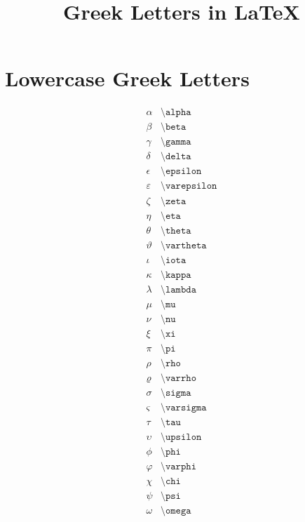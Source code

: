 \documentclass{article}
\title{Greek Letters in LaTeX}
\author{}
\date{}
\begin{document}
\maketitle

\section*{Lowercase Greek Letters}

\[
\begin{array}{ll}
\alpha & \texttt{\textbackslash alpha} \\
\beta & \texttt{\textbackslash beta} \\
\gamma & \texttt{\textbackslash gamma} \\
\delta & \texttt{\textbackslash delta} \\
\epsilon & \texttt{\textbackslash epsilon} \\
\varepsilon & \texttt{\textbackslash varepsilon} \\
\zeta & \texttt{\textbackslash zeta} \\
\eta & \texttt{\textbackslash eta} \\
\theta & \texttt{\textbackslash theta} \\
\vartheta & \texttt{\textbackslash vartheta} \\
\iota & \texttt{\textbackslash iota} \\
\kappa & \texttt{\textbackslash kappa} \\
\lambda & \texttt{\textbackslash lambda} \\
\mu & \texttt{\textbackslash mu} \\
\nu & \texttt{\textbackslash nu} \\
\xi & \texttt{\textbackslash xi} \\
\pi & \texttt{\textbackslash pi} \\
\rho & \texttt{\textbackslash rho} \\
\varrho & \texttt{\textbackslash varrho} \\
\sigma & \texttt{\textbackslash sigma} \\
\varsigma & \texttt{\textbackslash varsigma} \\
\tau & \texttt{\textbackslash tau} \\
\upsilon & \texttt{\textbackslash upsilon} \\
\phi & \texttt{\textbackslash phi} \\
\varphi & \texttt{\textbackslash varphi} \\
\chi & \texttt{\textbackslash chi} \\
\psi & \texttt{\textbackslash psi} \\
\omega & \texttt{\textbackslash omega}
\end{array}
\]
\end{document}
